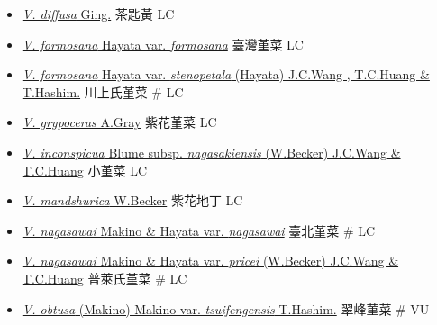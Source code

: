 \begin{itemize}
\begin{itemize}
        \item[] \href{http://www.theplantlist.org/tpl1.1/search?q=Viola+diffusa}{\textit{V. diffusa} Ging.}   茶匙黃   LC
        \item[] \href{http://www.theplantlist.org/tpl1.1/search?q=Viola+formosana+var.+formosana}{\textit{V. formosana} Hayata var. \textit{formosana}}   臺灣堇菜   LC
        \item[] \href{http://www.theplantlist.org/tpl1.1/search?q=Viola+formosana+var.+stenopetala}{\textit{V. formosana} Hayata var. \textit{stenopetala} (Hayata) J.C.Wang , T.C.Huang \& T.Hashim.}   川上氏堇菜  \# LC
        \item[] \href{http://www.theplantlist.org/tpl1.1/search?q=Viola+grypoceras}{\textit{V. grypoceras} A.Gray}   紫花堇菜   LC
        \item[] \href{http://www.theplantlist.org/tpl1.1/search?q=Viola+inconspicua+subsp.+nagasakiensis}{\textit{V. inconspicua} Blume subsp. \textit{nagasakiensis} (W.Becker) J.C.Wang \& T.C.Huang}   小堇菜   LC
        \item[] \href{http://www.theplantlist.org/tpl1.1/search?q=Viola+mandshurica}{\textit{V. mandshurica} W.Becker}   紫花地丁   LC
        \item[] \href{http://www.theplantlist.org/tpl1.1/search?q=Viola+nagasawai+var.+nagasawai}{\textit{V. nagasawai} Makino \& Hayata var. \textit{nagasawai}}   臺北堇菜  \# LC
        \item[] \href{http://www.theplantlist.org/tpl1.1/search?q=Viola+nagasawai+var.+pricei}{\textit{V. nagasawai} Makino \& Hayata var. \textit{pricei} (W.Becker) J.C.Wang \& T.C.Huang}   普萊氏堇菜  \# LC
        \item[] \href{http://www.theplantlist.org/tpl1.1/search?q=Viola+obtusa+var.+tsuifengensis}{\textit{V. obtusa} (Makino) Makino var. \textit{tsuifengensis} T.Hashim.}   翠峰菫菜  \# VU

\end{itemize}
\end{itemize}
